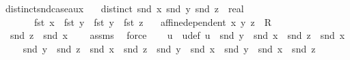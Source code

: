 \begin{isabellebody}
\isanewline
%
\endisadelimproof
\isanewline
{}\isamarkupfalse%
\ distinct{\isacharunderscore}{\kern0pt}snd{\isacharunderscore}{\kern0pt}case{\isacharunderscore}{\kern0pt}aux{\isacharcolon}{\kern0pt}\isanewline
\ \ \ {\isachardoublequoteopen}distinct\ {\isacharbrackleft}{\kern0pt}snd\ x{\isacharcomma}{\kern0pt}\ snd\ y{\isacharcomma}{\kern0pt}\ snd\ z\ {\isacharcolon}{\kern0pt}{\isacharcolon}{\kern0pt}\ real{\isacharbrackright}{\kern0pt}{\isachardoublequoteclose}\ \isanewline
\ \ \ \ \ \ \ {\isachardoublequoteopen}fst\ x\ {\isacharequal}{\kern0pt}\ fst\ y{\isachardoublequoteclose}\ \ {\isachardoublequoteopen}fst\ y\ {\isacharequal}{\kern0pt}\ fst\ z{\isachardoublequoteclose}\isanewline
\ \ \ {\isachardoublequoteopen}affine{\isacharunderscore}{\kern0pt}dependent\ {\isacharbraceleft}{\kern0pt}x{\isacharcomma}{\kern0pt}\ y{\isacharcomma}{\kern0pt}\ z\ {\isacharcolon}{\kern0pt}{\isacharcolon}{\kern0pt}\ R{}{\isacharbraceright}{\kern0pt}{\isachardoublequoteclose}\isanewline
%
\isadelimproof
%
\endisadelimproof
%
\isatagproof
{}\isamarkupfalse%
{\isacharminus}{\kern0pt}\isanewline
\ \ \isamarkupfalse%
\ {}{\isacharcolon}{\kern0pt}\ {\isachardoublequoteopen}snd\ z\ {\isacharminus}{\kern0pt}\ snd\ x\ {\isasymnoteq}\ {}{\isachardoublequoteclose}\ \isamarkupfalse%
\ assms{\isacharparenleft}{\kern0pt}{}{\isacharparenright}{\kern0pt}\ \isamarkupfalse%
\ force\isanewline
\ \ \isamarkupfalse%
\ u\ \ u{\isacharunderscore}{\kern0pt}def{\isacharcolon}{\kern0pt}\ {\isachardoublequoteopen}u\ {\isacharequal}{\kern0pt}\ {\isacharparenleft}{\kern0pt}snd\ y\ {\isacharminus}{\kern0pt}\ snd\ x{\isacharparenright}{\kern0pt}\ {\isacharslash}{\kern0pt}\ {\isacharparenleft}{\kern0pt}snd\ z\ {\isacharminus}{\kern0pt}\ snd\ x{\isacharparenright}{\kern0pt}{\isachardoublequoteclose}\isanewline
\ \ \isamarkupfalse%
\ \ {\isachardoublequoteopen}snd\ y\ {\isacharasterisk}{\kern0pt}\ {\isacharparenleft}{\kern0pt}snd\ z\ {\isacharminus}{\kern0pt}\ snd\ x{\isacharparenright}{\kern0pt}\ {\isacharequal}{\kern0pt}\ {\isacharparenleft}{\kern0pt}snd\ z\ {\isacharminus}{\kern0pt}\ snd\ y{\isacharparenright}{\kern0pt}\ {\isacharasterisk}{\kern0pt}\ snd\ x\ {\isacharplus}{\kern0pt}\ {\isacharparenleft}{\kern0pt}snd\ y\ {\isacharminus}{\kern0pt}\ snd\ x{\isacharparenright}{\kern0pt}\ {\isacharasterisk}{\kern0pt}\ snd\ z{\isachardoublequoteclose}\ \isamarkupfalse%

\end{isabellebody}
